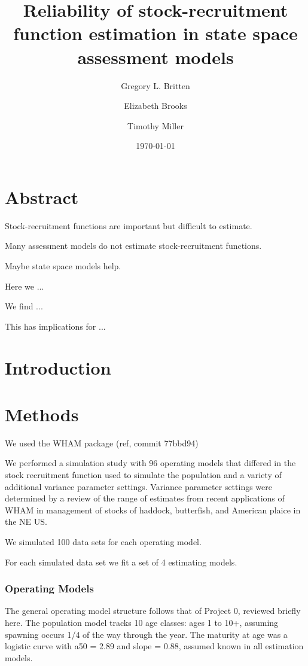 \documentclass[11pt]{article}
\title{Reliability of stock-recruitment function estimation in state space assessment models}
\author[1]{Gregory L. Britten}
\author[2]{Elizabeth Brooks}
\author[2]{Timothy Miller}
\affil[1]{Woods Hole Oceanographic Institution}
\affil[2]{Northeast Fisheries Science Center}
\date{\small{\printdayoff\today}}
\begin{document}
\maketitle 
\linenumbers
\section*{Abstract}
Stock-recruitment functions are important but difficult to estimate.

Many assessment models do not estimate stock-recruitment functions.

Maybe state space models help.

Here we ...

We find ...

This has implications for ...
\section*{Introduction}

\section*{Methods}
We used the WHAM package (ref, commit 77bbd94)

We performed a simulation study with 96 operating models that differed in the stock recruitment function used to simulate the population and a variety of additional variance parameter settings. 
Variance parameter settings were determined by a review of the range of estimates from recent applications of WHAM in management of stocks of haddock, butterfish, and American plaice in the NE US.

We simulated 100 data sets for each operating model. 

For each simulated data set we fit a set of 4 estimating models.

\subsubsection*{Operating Models}
The general operating model structure follows that of Project 0, reviewed briefly here. 
The population model tracks 10 age classes: ages 1 to 10+, assuming spawning occurs
1/4 of the way through the year. 
The maturity at age was a logistic curve with a50 = 2.89 and slope = 0.88, assumed known in all estimation models.
\end{document}

